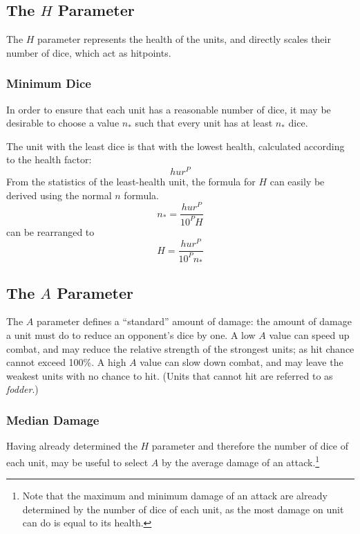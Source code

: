 \documentclass[twocolumn]{article}
\begin{document}
\subsection{The $H$ Parameter}

The $H$ parameter represents the health of the units,
and directly scales their number of dice, which act as hitpoints.

\subsubsection{Minimum Dice}

In order to ensure that each unit has a reasonable number of dice,
it may be desirable to choose a value $n_*$
such that every unit has at least $n_*$ dice.

The unit with the least dice is that with the lowest health,
calculated according to the health factor:
\[
    h u r^P
\]
From the statistics of the least-health unit, the formula for $H$
can easily be derived using the normal $n$ formula.
\[
    n_* =  
        \frac
            {h u r^P}
            {10^P H}
\]
can be rearranged to
\[
    H =  
        \frac
            {h u r^P}
            {10^P n_*}
\]


\subsection{The $A$ Parameter}


The $A$ parameter defines a ``standard'' amount of damage:
the amount of damage a unit must do to reduce an opponent's dice by one.
A low $A$ value can speed up combat,
and may reduce the relative strength of the strongest units;
as hit chance cannot exceed 100\%.
A high $A$ value can slow down combat,
and may leave the weakest units with no chance to hit.
(Units that cannot hit are referred to as \emph{fodder}.)

\subsubsection{Median Damage}

Having already determined the $H$ parameter and
therefore the number of dice of each unit,
may be useful to select $A$ by the average damage of an attack.\footnote{
    Note that the maximum and minimum damage of an attack
    are already determined by the number of dice of each unit,
    as the most damage on unit can do is equal to its health.
}
\end{document}
